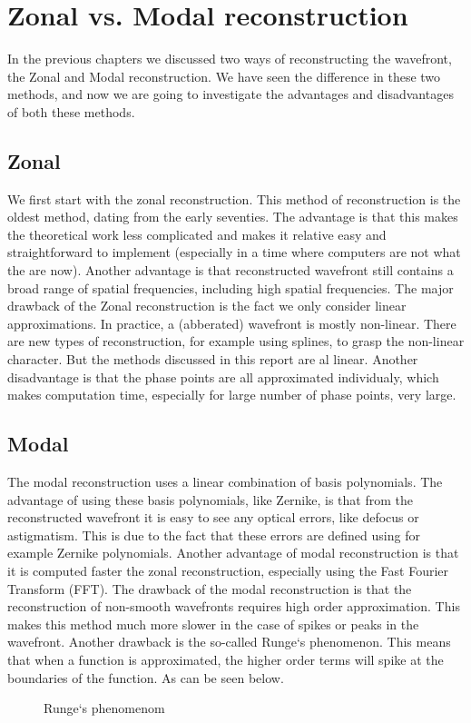 \documentclass{article}
\begin{document}
\section{Zonal vs. Modal reconstruction}
In the previous chapters we discussed two ways of reconstructing the wavefront, the Zonal and Modal reconstruction. We have seen the difference in these two methods, and now we are going to investigate the advantages and disadvantages of both these methods.

\subsection{Zonal}
We first start with the zonal reconstruction. This method of reconstruction is the oldest method, dating from the early seventies. The advantage is that this makes the theoretical work less complicated and makes it relative easy and straightforward to implement (especially in a time where computers are not what the are now). Another advantage is that reconstructed wavefront still contains a broad range of spatial frequencies, including high spatial frequencies. 
\newline
\newline
The major drawback of the Zonal reconstruction is the fact we only consider linear approximations. In practice, a (abberated) wavefront is mostly non-linear. There are new types of reconstruction, for example using splines, to grasp the non-linear character. But the methods discussed in this report are al linear. Another disadvantage is that the phase points are all approximated individualy, which makes computation time, especially for large number of phase points, very large.

\subsection{Modal}
The modal reconstruction uses a linear combination of basis polynomials. The advantage of using these basis polynomials, like Zernike, is that from the reconstructed wavefront it is easy to see any optical errors, like defocus or astigmatism. This is due to the fact that these errors are defined using for example Zernike polynomials. Another advantage of modal reconstruction is that it is computed faster the zonal reconstruction, especially using the Fast Fourier Transform (FFT).
\newline
\newline
The drawback of the modal reconstruction is that the reconstruction of non-smooth wavefronts requires high order approximation. This makes this method much more slower in the case of spikes or peaks in the wavefront. Another drawback is the so-called Runge`s phenomenon. This means that when a function is approximated, the higher order terms will spike at the boundaries of the function. As can be seen below.
\begin{figure}[h!]
  \centering
  \caption{Runge`s phenomenom}
\end{figure} 

% 
% 
\end{document}
